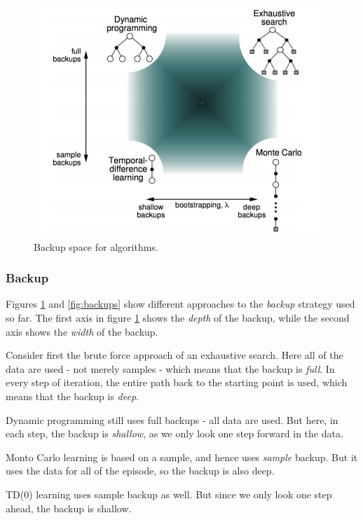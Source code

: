 \documentclass[12pt, a4paper]{article}
\numberwithin{equation}{section}
\begin{document}
\begin{figure}
\centering
\includegraphics[width=\textwidth]{rl_overview}
\caption{Backup space for algorithms.}
\label{fig:rl_overview}
\end{figure}

\subsubsection{Backup}
Figures \ref{fig:rl_overview} and \ref{fig:backups} show different approaches to the \textit{backup} strategy used so far. The first axis in figure \ref{fig:rl_overview} shows the \textit{depth} of the backup, while the second axis shows the \textit{width} of the backup.

Consider first the brute force approach of an exhaustive search. Here all of the data are used - not merely samples - which means that the backup is \textit{full}. In every step of iteration, the entire path back to the starting point is used, which means that the backup is \textit{deep}.

Dynamic programming still uses full backups - all data are used. But here, in each step, the backup is \textit{shallow}, as we only look one step forward in the data.

Monto Carlo learning is based on a sample, and hence uses \textit{sample} backup. But it uses the data for all of the episode, so the backup is also deep.

TD(0) learning uses sample backup as well. But since we only look one step ahead, the backup is shallow.
\end{document}
